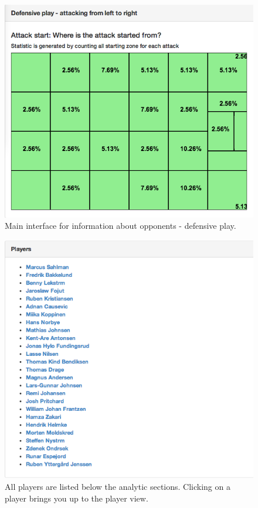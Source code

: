 \begin{figure}[ht!]
\centering
\includegraphics[width=1\textwidth]{images/general/team_analysis3.png}
\caption{Main interface for information about opponents - defensive play.}
\label{fig:team_analysis3}
\end{figure}

\begin{figure}[ht!]
\centering
\includegraphics[width=1\textwidth]{images/general/team_analysis4.png}
\caption{All players are listed below the analytic sections. Clicking on a player brings you up to the player view.}
\label{fig:team_analysis4}
\end{figure}

